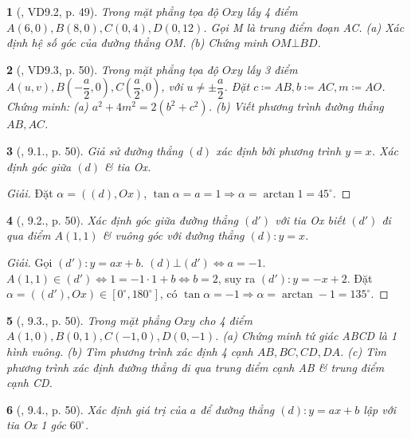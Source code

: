 \documentclass{article}
\newtheorem{baitoan}{}
\begin{document}
\begin{baitoan}[\cite{TLCT_THCS_Toan_9_dai_so}, VD9.2, p. 49]
	Trong mặt phẳng tọa độ $Oxy$ lấy 4 điểm $A(6,0),B(8,0),C(0,4),D(0,12)$. Gọi M là trung điểm đoạn AC. (a) Xác định hệ số góc của đường thẳng OM. (b) Chứng minh $OM\bot BD$.
\end{baitoan}

\begin{baitoan}[\cite{TLCT_THCS_Toan_9_dai_so}, VD9.3, p. 50]
	Trong mặt phẳng tọa độ $Oxy$ lấy 3 điểm $A(u,v),B\left(-\dfrac{a}{2},0\right),C\left(\dfrac{a}{2},0\right)$, với $u\ne\pm\dfrac{a}{2}$. Đặt $c\coloneqq AB,b\coloneqq AC,m\coloneqq AO$. Chứng minh: (a) $a^2 + 4m^2 = 2(b^2 + c^2)$. (b) Viết phương trình đường thẳng $AB,AC$.
\end{baitoan}

\begin{baitoan}[\cite{TLCT_THCS_Toan_9_dai_so}, 9.1., p. 50]
	Giả sử đường thẳng $(d)$ xác định bởi phương trình $y = x$. Xác định góc giữa $(d)$ \& tia Ox.
\end{baitoan}

\begin{proof}[Giải]
	Đặt $\alpha = ((d),Ox)$, $\tan\alpha = a = 1\Rightarrow\alpha = \arctan1 = 45^\circ$.
\end{proof}

\begin{baitoan}[\cite{TLCT_THCS_Toan_9_dai_so}, 9.2., p. 50]
	Xác định góc giữa đường thẳng $(d')$ với tia Ox biết $(d')$ đi qua điểm $A(1,1)$ \& vuông góc với đường thẳng $(d):y = x$.
\end{baitoan}

\begin{proof}[Giải]
	Gọi $(d'):y = ax + b$. $(d)\bot(d')\Leftrightarrow a = -1$. $A(1,1)\in(d')\Leftrightarrow 1 = -1\cdot1 + b\Leftrightarrow b = 2$, suy ra $(d'):y = -x + 2$. Đặt $\alpha = ((d'),Ox)\in[0^\circ,180^\circ]$, có $\tan\alpha = -1\Rightarrow\alpha = \arctan-1 = 135^\circ$.
\end{proof}

\begin{baitoan}[\cite{TLCT_THCS_Toan_9_dai_so}, 9.3., p. 50]
	Trong mặt phẳng $Oxy$ cho 4 điểm $A(1,0),B(0,1),C(-1,0),D(0,-1)$. (a) Chứng minh tứ giác ABCD là 1 hình vuông. (b) Tìm phương trình xác định 4 cạnh $AB,BC,CD,DA$. (c) Tìm phương trình xác định đường thẳng đi qua trung điểm cạnh AB \& trung điểm cạnh CD.
\end{baitoan}

\begin{baitoan}[\cite{TLCT_THCS_Toan_9_dai_so}, 9.4., p. 50]
	Xác định giá trị của $a$ để đường thẳng $(d):y = ax + b$ lập với tia Ox 1 góc $60^\circ$.
\end{baitoan}
\end{document}
